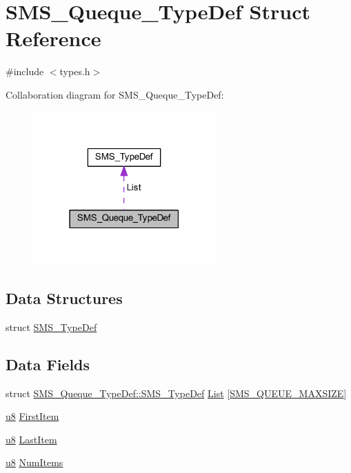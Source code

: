 \hypertarget{struct_s_m_s___queque___type_def}{}\section{S\+M\+S\+\_\+\+Queque\+\_\+\+Type\+Def Struct Reference}
\label{struct_s_m_s___queque___type_def}


{\ttfamily \#include $<$types.\+h$>$}



Collaboration diagram for S\+M\+S\+\_\+\+Queque\+\_\+\+Type\+Def\+:
\nopagebreak
\begin{figure}[H]
\begin{center}
\leavevmode
\includegraphics[width=198pt]{struct_s_m_s___queque___type_def__coll__graph}
\end{center}
\end{figure}
\subsection*{Data Structures}
\begin{DoxyCompactItemize}
\item 
struct \hyperlink{struct_s_m_s___queque___type_def_1_1_s_m_s___type_def}{S\+M\+S\+\_\+\+Type\+Def}
\end{DoxyCompactItemize}
\subsection*{Data Fields}
\begin{DoxyCompactItemize}
\item 
struct \hyperlink{struct_s_m_s___queque___type_def_1_1_s_m_s___type_def}{S\+M\+S\+\_\+\+Queque\+\_\+\+Type\+Def\+::\+S\+M\+S\+\_\+\+Type\+Def} \hyperlink{struct_s_m_s___queque___type_def_ab41a6d7526c94d7ba28a72e2f37aabf8}{List} \mbox{[}\hyperlink{types_8h_a1ae0ca719299883a2149ed278e9a1a97}{S\+M\+S\+\_\+\+Q\+U\+E\+U\+E\+\_\+\+M\+A\+X\+S\+I\+Z\+E}\mbox{]}
\item 
\hyperlink{types_8h_aed742c436da53c1080638ce6ef7d13de}{u8} \hyperlink{struct_s_m_s___queque___type_def_a02e3816c48764fe1b9db7b5944f3e72f}{First\+Item}
\item 
\hyperlink{types_8h_aed742c436da53c1080638ce6ef7d13de}{u8} \hyperlink{struct_s_m_s___queque___type_def_ac709f50bfbbb3c69a54b858b3ae7423d}{Last\+Item}
\item 
\hyperlink{types_8h_aed742c436da53c1080638ce6ef7d13de}{u8} \hyperlink{struct_s_m_s___queque___type_def_a84d6da72470ad7fca2b7482887203f3e}{Num\+Items}
\end{DoxyCompactItemize}


